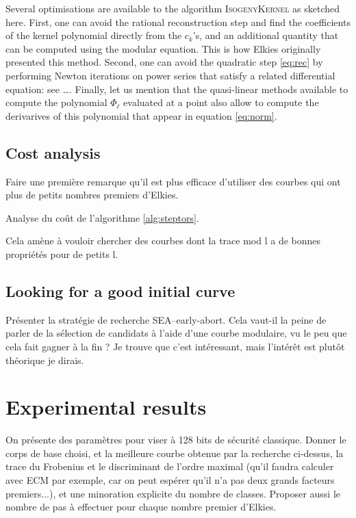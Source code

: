 \documentclass{article}
\newcommand{\algstyle}[1]{\textsc{#1}}
\theoremstyle{definition}
\begin{document}
Several optimisations are available to the algorithm \algstyle{IsogenyKernel}
as sketched here. First, one can avoid the rational reconstruction step and
find the coefficients of the kernel polynomial directly from the $c_k$'s,
and an additional quantity that can be computed using the modular equation.
This is how Elkies originally presented this method. Second, one can avoid
the quadratic step \ref{eq:rec} by performing Newton iterations on power
series that satisfy a related differential equation: see \ldots. Finally,
let us mention that the quasi-linear methods available to compute the
polynomial $\Phi_\ell$ evaluated at a point also allow to compute the
derivarives of this polynomial that appear in equation \ref{eq:norm}.


\subsection{Cost analysis}



Faire une première remarque qu'il est plus efficace d'utiliser des
courbes qui ont plus de petits nombres premiers d'Elkies.

Analyse du coût de l'algorithme \ref{alg:steptors}.

Cela amène à vouloir chercher des courbes dont la trace mod l a de
bonnes propriétés pour de petits l.


\subsection{Looking for a good initial curve}

Présenter la stratégie de
recherche SEA--early-abort. Cela vaut-il la peine de parler de la
sélection de candidats à l'aide d'une courbe modulaire, vu le peu que
cela fait gagner à la fin ? Je trouve que c'est intéressant, mais
l'intérêt est plutôt théorique je dirais.

\section{Experimental results}

On présente des paramètres pour viser à 128 bits de sécurité
classique.  Donner le corps de base choisi, et la meilleure courbe
obtenue par la recherche ci-dessus, la trace du Frobenius et le
discriminant de l'ordre maximal (qu'il faudra calculer avec ECM par
exemple, car on peut espérer qu'il n'a pas deux grands facteurs
premiers...), et une minoration explicite du nombre de classes.
Proposer aussi le nombre de pas à effectuer pour chaque nombre premier
d'Elkies.
\end{document}
